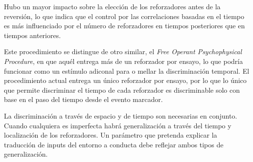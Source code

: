 \documentclass[a4paper,12pt]{article}
\begin{document}
Hubo un mayor impacto sobre la elección de los reforzadores antes de la reversión, lo que indica que el control por las correlaciones basadas en el tiempo es más influenciado por el número de reforzadores en tiempos posteriores que en tiempos anteriores.

Este procedimiento se distingue de otro similar, el {\itshape Free Operant Psychophysical Procedure}, en que aquél entrega más de un reforzador por ensayo, lo que podría funcionar como un estímulo adiconal para o mellar la discriminación temporal.
El procedimiento actual entrega un único reforzador por ensayo, por lo que lo único que permite discriminar el tiempo de cada reforzador es discriminable solo con base en el paso del tiempo desde el evento marcador.

La discriminación a través de espacio y de tiempo son necesarias en conjunto. Cuando cualquiera es imperfecta habrá generalización a través del tiempo y localización de los reforzadores. Un parámetro que pretenda explicar la traducción de inputs del entorno a conducta debe reflejar ambos tipos de generalización.
\end{document}
